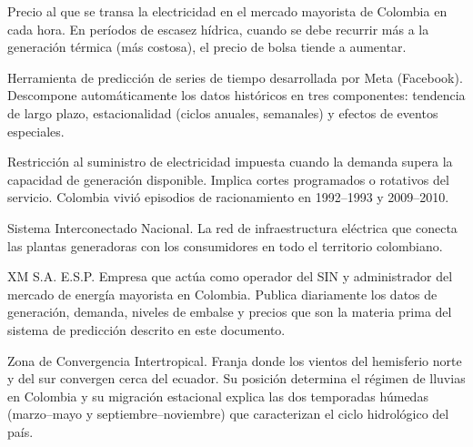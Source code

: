 \documentclass[11pt,a4paper]{article}
\begin{document}
\begin{small}
{\begin{description}[leftmargin=*,style=nextline,font=\bfseries\color{titleblue},itemsep=5pt]
\item[Precio de bolsa]
Precio al que se transa la electricidad en el mercado mayorista de Colombia en cada hora. En períodos de escasez hídrica, cuando se debe recurrir más a la generación térmica (más costosa), el precio de bolsa tiende a aumentar.

\item[Prophet]
Herramienta de predicción de series de tiempo desarrollada por Meta (Facebook). Descompone automáticamente los datos históricos en tres componentes: tendencia de largo plazo, estacionalidad (ciclos anuales, semanales) y efectos de eventos especiales.

\item[Racionamiento eléctrico]
Restricción al suministro de electricidad impuesta cuando la demanda supera la capacidad de generación disponible. Implica cortes programados o rotativos del servicio. Colombia vivió episodios de racionamiento en 1992--1993 y 2009--2010.

\item[SIN]
Sistema Interconectado Nacional. La red de infraestructura eléctrica que conecta las plantas generadoras con los consumidores en todo el territorio colombiano.

\item[XM]
XM S.A. E.S.P. Empresa que actúa como operador del SIN y administrador del mercado de energía mayorista en Colombia. Publica diariamente los datos de generación, demanda, niveles de embalse y precios que son la materia prima del sistema de predicción descrito en este documento.

\item[ZCIT]
Zona de Convergencia Intertropical. Franja donde los vientos del hemisferio norte y del sur convergen cerca del ecuador. Su posición determina el régimen de lluvias en Colombia y su migración estacional explica las dos temporadas húmedas (marzo--mayo y septiembre--noviembre) que caracterizan el ciclo hidrológico del país.

\end{description}
}
\end{small}
\end{document}
